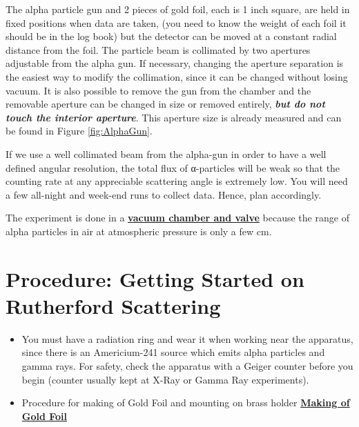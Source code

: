 \documentclass{../lab}
\begin{document}
The alpha particle gun and 2 pieces of gold foil, each is 1 inch square, are held in fixed positions when data are taken, (you need to know the weight of each foil it should be in the log book) but the detector can be moved at a constant radial distance from the foil. The particle beam is collimated by two apertures adjustable from the alpha gun. If necessary, changing the aperture separation is the easiest way to modify the collimation, since it can be changed without losing vacuum. It is also possible to remove the gun from the chamber and the removable aperture can be changed in size or removed entirely, \emph{\textbf{but do not touch the interior aperture}}. This aperture size is already measured and can be found in Figure \ref{fig:AlphaGun}.

If we use a well collimated beam from the alpha-gun in order to have a well defined angular resolution, the total flux of α-particles will be weak so that the counting rate at any appreciable scattering angle is extremely low. You will need a few all-night and week-end runs to collect data. Hence, plan accordingly.

The experiment is done in a \href{http://experimentationlab.berkeley.edu/sites/default/files/images/RUT\_Chamber.jpg}{\textbf{vacuum chamber and valve}} because the range of alpha particles in air at atmospheric pressure is only a few cm.

\section{Procedure: Getting Started on Rutherford Scattering}

\begin{itemize}
    \item You must have a radiation ring and wear it when working near the apparatus, since there is an Americium-241 source which emits alpha particles and gamma rays. For safety, check the apparatus with a Geiger counter before you begin (counter usually kept at X-Ray or Gamma Ray experiments).

    \item Procedure for making of Gold Foil and mounting on brass holder \href{http://physics111.lib.berkeley.edu/Physics111/Reprints/RUT/Procedure\%20for\%20Making\%20Foils.pdf}{\textbf{Making of Gold Foil}}

\end{itemize}
\end{document}

